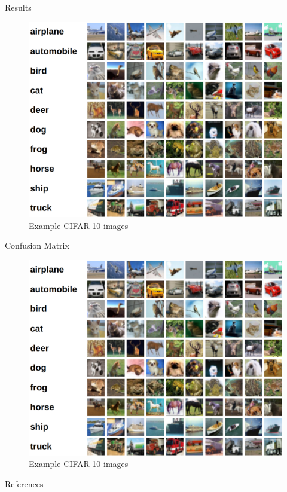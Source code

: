 \documentclass{beamer}
\begin{document}
\begin{frame}{Results}
	\begin{figure}
		\includegraphics[width=.65\textwidth]{../Images/cifar-10.png}
		\caption{Example CIFAR-10 images \cite{cifar10}}
	\end{figure}
\end{frame}

\begin{frame}{Confusion Matrix}
	\begin{figure}
		\includegraphics[width=.65\textwidth]{../Images/cifar-10.png}
		\caption{Example CIFAR-10 images \cite{cifar10}}
	\end{figure}
\end{frame}


\begin{frame}[allowframebreaks]{References}
\printbibliography
\end{frame}
\end{document}
